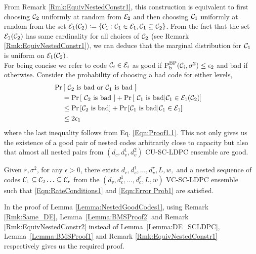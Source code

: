 \documentclass[journal,draftcls,onecolumn,12pt,twoside]{IEEEtran}
\begin{document}
\begin{IEEEproof}
 From Remark \ref{Rmk:EquivNestedConstr1}, this construction is equivalent to first choosing $\mathcal{C}_{2}$ uniformly at random from $\mathcal{E}_{2}$ and then choosing $\mathcal{C}_{1}$ uniformly at random from the set $\mathcal{E}_{1}(\mathcal{C}_{2})\mathrel{\mathop:}= \{\mathcal{C}_{1}:\mathcal{C}_{1}\in \mathcal{E}_{1},\mathcal{C}_{1}\subseteq \mathcal{C}_{2}\}$. From the fact that the set $\mathcal{E}_{1}(\mathcal{C}_{2})$ has same cardinality for all choices of $\mathcal{C}_{2}$ (see Remark \ref{Rmk:EquivNestedConstr1}), we can deduce that the marginal distribution for $\mathcal{C}_{1}$ is uniform on $\mathcal{E}_{1}(\mathcal{C}_{2})$.\\
 For being concise we refer to code $\mathcal{C}_{i}\in\mathcal{E}_{i}$ as good if $\text{P}_{\text{b}}^{\text{BP}}(\mathcal{C}_{i},\sigma^{2})\leq \epsilon_{2}$ and bad if otherwise. Consider the probability of choosing a bad code for either levels,
 \begin{align*}
\text{Pr}&\left[~ \mathcal{C}_{2}  \text{ is bad  or } \mathcal{C}_{1} \text{ is bad }\right] \\
&=\text{Pr}\left[~\mathcal{C}_{2} \text{ is bad } \right] +\text{Pr}\left[~\mathcal{C}_{1} \text{ is bad} \middle\vert \mathcal{C}_{1} \in \mathcal{E}_{1}(\mathcal{C}_{2}) \right] \\
&\leq \text{Pr}\left[\mathcal{C}_{2} \text{ is bad} \right] +\text{Pr}\left[\mathcal{C}_{1} \text{ is bad}\middle\vert \mathcal{C}_{1} \in \mathcal{E}_{1}\right] \\
&\leq 2\epsilon_{1}
 \end{align*}
 where the last inequality follows from%
 Eq. \eqref{Eqn:Proof1.1}. This not only gives us the existence of a good pair of nested codes arbitrarily close to capacity but also that almost all nested pairs from $(d_{c},d_{v}^{1},d_{v}^{2})$ CU-SC-LDPC ensemble are good.
\end{IEEEproof}

\begin{lemma}\label{Lemma:NestedGoodCodes2}
Given $r,\sigma^{2}$, for any $\epsilon>0$, there exists $d_{c},d_{v}^{1},\ldots, d_{v}^{r},L,w,$ and a nested sequence of codes $\mathcal{C}_{1}\subseteq \mathcal{C}_{2}\ldots \subseteq\mathcal{C}_{r}$ from the $(d_{v},d_{c}^{1},\ldots,d_{c}^{r},L,w)$ VC-SC-LDPC ensemble such that \eqref{Eqn:RateConditions1} and \eqref{Eqn:Error Prob1} are satisfied.
\end{lemma}
	\begin{IEEEproof}
In the proof of Lemma \ref{Lemma:NestedGoodCodes1}, using Remark \ref{Rmk:Same_DE}, Lemma~\ref{Lemma:BMSProof2} and Remark \ref{Rmk:EquivNestedConstr2}  instead of  Lemma~\ref{Lemma:DE_SCLDPC}, Lemma~\ref{Lemma:BMSProof1} and Remark \ref{Rmk:EquivNestedConstr1} respectively gives us the required proof.	
\end{IEEEproof}
\end{document}
